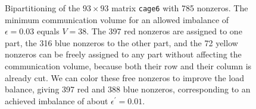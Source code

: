 \begin{figure}[htbp]
\label{fig:cage6}
  \centering
  \caption{Bipartitioning of the $93 \times 93 $ matrix \texttt{cage6} with 785 nonzeros.
The minimum communication volume for an allowed imbalance of $\epsilon=0.03$ equals $V=38$. 
The 397 red nonzeros are assigned to one part, the 316 blue nonzeros to the other part,
and the 72 yellow nonzeros can be freely assigned to any part without affecting
the communication volume, because both their row and their column is already cut.
We can color these free nonzeros to improve the load balance, giving 397 red and 388 blue nonzeros,
corresponding to an achieved imbalance of about $\epsilon^{\prime}=0.01$.}
\end{figure} 
